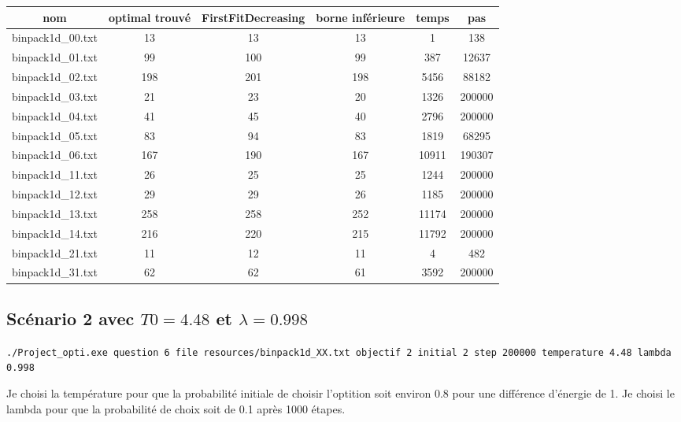 \documentclass[10pt,a4paper]{article}
\begin{document}
\begin{center}
  \begin{tabular}{ | c | c | c | c | c | c | }  \hline
    nom               & optimal trouvé   & FirstFitDecreasing & borne inférieure & temps & pas \\ \hline
    binpack1d\_00.txt & 13 & 13 & 13 & 1 & 138 \\ \hline
    binpack1d\_01.txt & 99 & 100 & 99 & 387 & 12637 \\ \hline
    binpack1d\_02.txt & 198 & 201 & 198 & 5456 & 88182 \\ \hline
    binpack1d\_03.txt & 21 & 23 & 20 & 1326 & 200000 \\ \hline
    binpack1d\_04.txt & 41 & 45 & 40 & 2796 & 200000 \\ \hline
    binpack1d\_05.txt & 83 & 94 & 83 & 1819 & 68295 \\ \hline
    binpack1d\_06.txt & 167 & 190 & 167 & 10911 & 190307 \\ \hline
    binpack1d\_11.txt & 26 & 25 & 25 & 1244 & 200000 \\ \hline
    binpack1d\_12.txt & 29 & 29 & 26 & 1185 & 200000 \\ \hline
    binpack1d\_13.txt & 258 & 258 & 252 & 11174 & 200000 \\ \hline
    binpack1d\_14.txt & 216 & 220 & 215 & 11792 & 200000 \\ \hline
    binpack1d\_21.txt & 11 & 12 & 11 & 4 & 482 \\ \hline
    binpack1d\_31.txt & 62 & 62 & 61 & 3592 & 200000 \\ \hline
  \end{tabular}
\end{center}

\subsection{Scénario 2 avec $T0 = 4.48$ et $\lambda = 0.998$}
\texttt{./Project\_opti.exe question 6 file resources/binpack1d\_XX.txt objectif 2 initial 2 step 200000 temperature 4.48 lambda 0.998}

Je choisi la température pour que la probabilité initiale de choisir l'optition soit environ 0.8 pour une différence d'énergie de 1.
Je choisi le lambda pour que la probabilité de choix soit de 0.1 après 1000 étapes.
\end{document}
